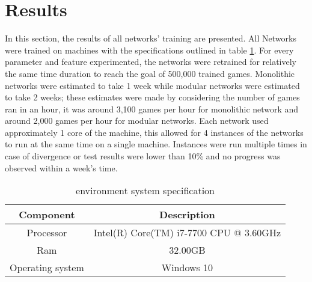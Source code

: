 \documentclass[12pt,a4paper]{article}
\begin{document}
\section{Results}
In this section, the results of all networks' training are presented. All Networks were trained on machines with the specifications outlined in table \ref{spec}. For every parameter and feature experimented, the networks were retrained  for relatively the same time duration to reach the goal of 500,000 trained games. Monolithic networks were estimated to take 1 week while modular networks were estimated to take 2 weeks; these estimates were made by considering the number of games ran in an hour, it was around 3,100 games per hour for monolithic network and around 2,000 games per hour for modular networks. Each network used approximately 1 core of the machine, this allowed for 4 instances of the networks to run at the same time on a single machine. Instances were run multiple times in case of divergence or test results were lower than 10\% and no progress was observed within a week’s time.
\begin{table}[htb]
    \centering
    \caption{environment system specification}
    \label{spec}
    \begin{tabular}{cc}
        \hline
        \hline
        Component & Description \\ 
        \hline
        Processor & Intel(R) Core(TM) i7-7700 CPU @ 3.60GHz \\ 
        \hline
        Ram & 32.00GB \\ 
        \hline
        Operating system & Windows 10 \\ 
        \hline
    \end{tabular}
\end{table}
\end{document}
